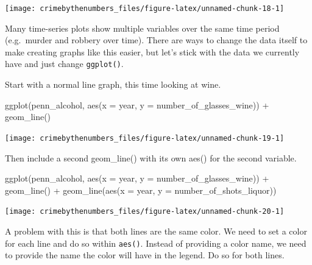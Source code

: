 \documentclass[
  12pt,
  openany]{book}
\newenvironment{Shaded}{\begin{snugshade}}{\end{snugshade}}
\newcommand{\AttributeTok}[1]{\textcolor[rgb]{0.61,0.61,0.61}{#1}}
\newcommand{\FunctionTok}[1]{\textcolor[rgb]{0,0,0}{#1}}
\newcommand{\NormalTok}[1]{#1}
\newcommand{\SpecialCharTok}[1]{\textcolor[rgb]{0,0,0}{#1}}
\begin{document}
\begin{center}\texttt{[image: crimebythenumbers\_files/figure-latex/unnamed-chunk-18-1]} \end{center}

Many time-series plots show multiple variables over the same time period (e.g.~murder and robbery over time). There are ways to change the data itself to make creating graphs like this easier, but let's stick with the data we currently have and just change \texttt{ggplot()}.

Start with a normal line graph, this time looking at wine.

\begin{Shaded}
\begin{Highlighting}[]
\FunctionTok{ggplot}\NormalTok{(penn\_alcohol, }\FunctionTok{aes}\NormalTok{(}\AttributeTok{x =}\NormalTok{ year, }\AttributeTok{y =}\NormalTok{ number\_of\_glasses\_wine)) }\SpecialCharTok{+}
  \FunctionTok{geom\_line}\NormalTok{()}
\end{Highlighting}
\end{Shaded}

\begin{center}\texttt{[image: crimebythenumbers\_files/figure-latex/unnamed-chunk-19-1]} \end{center}

Then include a second geom\_line() with its own aes() for the second variable.

\begin{Shaded}
\begin{Highlighting}[]
\FunctionTok{ggplot}\NormalTok{(penn\_alcohol, }\FunctionTok{aes}\NormalTok{(}\AttributeTok{x =}\NormalTok{ year, }\AttributeTok{y =}\NormalTok{ number\_of\_glasses\_wine)) }\SpecialCharTok{+}
  \FunctionTok{geom\_line}\NormalTok{() }\SpecialCharTok{+}
  \FunctionTok{geom\_line}\NormalTok{(}\FunctionTok{aes}\NormalTok{(}\AttributeTok{x =}\NormalTok{ year, }\AttributeTok{y =}\NormalTok{ number\_of\_shots\_liquor))}
\end{Highlighting}
\end{Shaded}

\begin{center}\texttt{[image: crimebythenumbers\_files/figure-latex/unnamed-chunk-20-1]} \end{center}

A problem with this is that both lines are the same color. We need to set a color for each line and do so within \texttt{aes()}. Instead of providing a color name, we need to provide the name the color will have in the legend. Do so for both lines.
\end{document}

